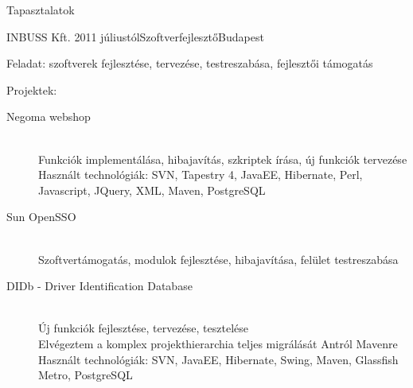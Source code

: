 \documentclass{resume} %
\begin{document}
\begin{rSection}{Tapasztalatok}

\begin{rSubsection}{INBUSS Kft.}
{2011 júliustól}{Szoftverfejlesztő}{Budapest}
\item Feladat: szoftverek fejlesztése, tervezése, testreszabása, fejlesztői támogatás
\item Projektek:
	\begin{description}
		\item[Negoma webshop] \hfill \\
		Funkciók implementálása, hibajavítás, szkriptek írása, új funkciók tervezése \\
		Használt technológiák: SVN, Tapestry 4, JavaEE, Hibernate, Perl, Javascript, JQuery, XML, Maven, PostgreSQL
		\item[Sun OpenSSO] \hfill \\
		Szoftvertámogatás, modulok fejlesztése, hibajavítása, felület testreszabása
		\item[DIDb - Driver Identification Database] \hfill \\
		Új funkciók fejlesztése, tervezése, tesztelése \\
		Elvégeztem a komplex projekthierarchia teljes migrálását Antról Mavenre \\
		Használt technológiák: SVN, JavaEE, Hibernate, Swing, Maven, Glassfish Metro, PostgreSQL \\
	\end{description}
\end{rSubsection}



\end{rSection}
\end{document}
